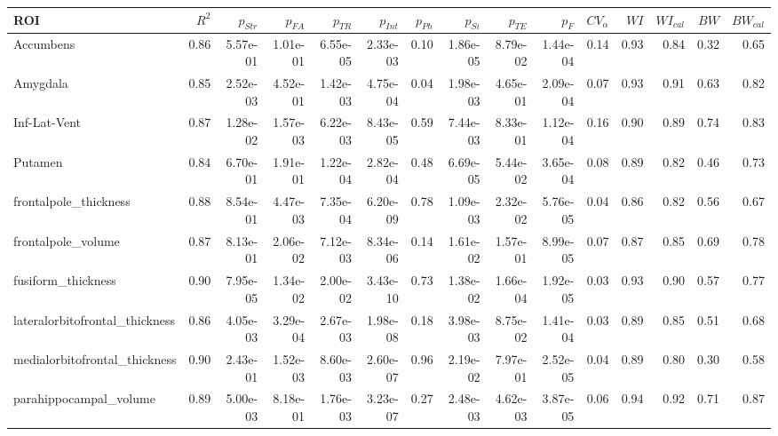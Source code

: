 \begin{table}
[]
\centering
\begin{tabular}{lrrrrrrrrrrrrrr}
\toprule
{ROI} &    $R^2$ &  $p_{Str}$ &  $p_{FA}$ &      $p_{TR}$ &  $p_{Int}$ &  $p_{Ph}$ &  $p_{Si}$ &      $p_{TE}$ &       $p_F$ &   $CV_{\alpha}$ &    $WI$ &  $WI_{cal}$ &    $BW$ &  $BW_{cal}$ \\
\midrule
Accumbens                     &  0.86 &    5.57e-01 &     1.01e-01 &  6.55e-05 &     2.33e-03 &          0.10 &      1.86e-05 &  8.79e-02 &  1.44e-04 &  0.14 &  0.93 &    0.84 &  0.32 &    0.65 \\
Amygdala                           &  0.85 &    2.52e-03 &     4.52e-01 &  1.42e-03 &     4.75e-04 &          0.04 &      1.98e-03 &  4.65e-01 &  2.09e-04 &  0.07 &  0.93 &    0.91 &  0.63 &    0.82 \\
Inf-Lat-Vent                       &  0.87 &    1.28e-02 &     1.57e-03 &  6.22e-03 &     8.43e-05 &          0.59 &      7.44e-03 &  8.33e-01 &  1.12e-04 &  0.16 &  0.90 &    0.89 &  0.74 &    0.83 \\
Putamen                            &  0.84 &    6.70e-01 &     1.91e-01 &  1.22e-04 &     2.82e-04 &          0.48 &      6.69e-05 &  5.44e-02 &  3.65e-04 &  0.08 &  0.89 &    0.82 &  0.46 &    0.73 \\
frontalpole\_thickness              &  0.88 &    8.54e-01 &     4.47e-03 &  7.35e-04 &     6.20e-09 &          0.78 &      1.09e-03 &  2.32e-02 &  5.76e-05 &  0.04 &  0.86 &    0.82 &  0.56 &    0.67 \\
frontalpole\_volume                 &  0.87 &    8.13e-01 &     2.06e-02 &  7.12e-03 &     8.34e-06 &          0.14 &      1.61e-02 &  1.57e-01 &  8.99e-05 &  0.07 &  0.87 &    0.85 &  0.69 &    0.78 \\
fusiform\_thickness                 &  0.90 &    7.95e-05 &     1.34e-02 &  2.00e-02 &     3.43e-10 &          0.73 &      1.38e-02 &  1.66e-04 &  1.92e-05 &  0.03 &  0.93 &    0.90 &  0.57 &    0.77 \\
lateralorbitofrontal\_thickness     &  0.86 &    4.05e-03 &     3.29e-04 &  2.67e-03 &     1.98e-08 &          0.18 &      3.98e-03 &  8.75e-02 &  1.41e-04 &  0.03 &  0.89 &    0.85 &  0.51 &    0.68 \\
medialorbitofrontal\_thickness      &  0.90 &    2.43e-01 &     1.52e-03 &  8.60e-03 &     2.60e-07 &          0.96 &      2.19e-02 &  7.97e-01 &  2.52e-05 &  0.04 &  0.89 &    0.80 &  0.30 &    0.58 \\
parahippocampal\_volume             &  0.89 &    5.00e-03 &     8.18e-01 &  1.76e-03 &     3.23e-07 &          0.27 &      2.48e-03 &  4.62e-03 &  3.87e-05 &  0.06 &  0.94 &    0.92 &  0.71 &    0.87 \\

\end{tabular}
\end{table}
